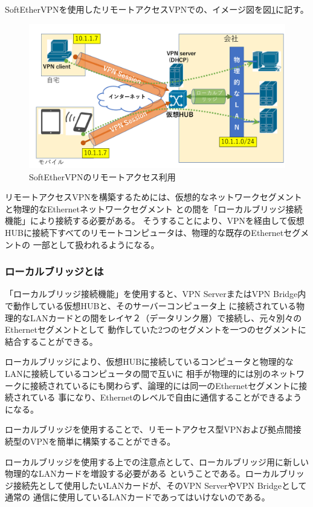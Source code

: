 \documentclass[11pt,a4j,titlepage]{jreport}
\begin{document}
SoftEtherVPNを使用したリモートアクセスVPNでの、イメージ図を図\ref{remoteaccess}に記す。
\begin{figure}[tbp]
    \centering
    \includegraphics*[width=1.0\textwidth,page=1]{graphs/softetherVPN.pdf}
    \caption{SoftEtherVPNのリモートアクセス利用}
    \label{remoteaccess}
\end{figure}



リモートアクセスVPNを構築するためには、仮想的なネットワークセグメントと物理的なEthernetネットワークセグメント
との間を「ローカルブリッジ接続機能」により接続する必要がある。
そうすることにより、VPNを経由して仮想HUBに接続下すべてのリモートコンピュータは、物理的な既存のEthernetセグメントの
一部として扱われるようになる。

\subsubsection*{ローカルブリッジとは}
「ローカルブリッジ接続機能」を使用すると、VPN ServerまたはVPN Bridge内で動作している仮想HUBと、そのサーバーコンピュータ上
に接続されている物理的なLANカードとの間をレイヤ２（データリンク層）で接続し、元々別々のEthernetセグメントとして
動作していた2つのセグメントを一つのセグメントに結合することができる。\par
ローカルブリッジにより、仮想HUBに接続しているコンピュータと物理的なLANに接続しているコンピュータの間で互いに
相手が物理的には別のネットワークに接続されているにも関わらず、論理的には同一のEthernetセグメントに接続されている
事になり、Ethernetのレベルで自由に通信することができるようになる。\par
ローカルブリッジを使用することで、リモートアクセス型VPNおよび拠点間接続型のVPNを簡単に構築することができる。\par
ローカルブリッジを使用する上での注意点として、ローカルブリッジ用に新しい物理的なLANカードを増設する必要がある
ということである。ローカルブリッジ接続先として使用したいLANカードが、そのVPN ServerやVPN Bridgeとして通常の
通信に使用しているLANカードであってはいけないのである。
\end{document}
